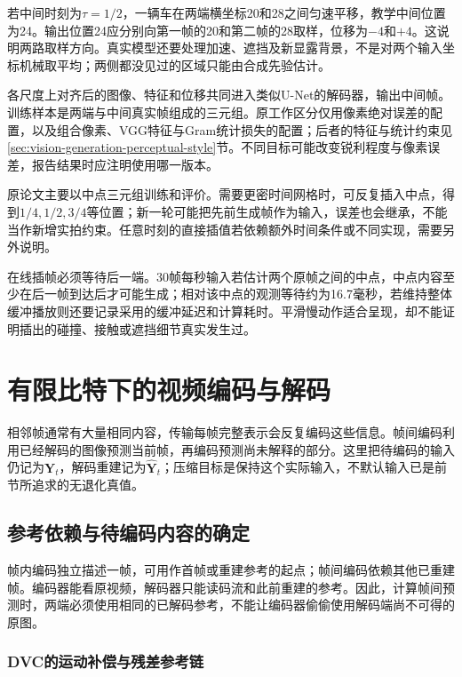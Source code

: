 若中间时刻为$\tau=1/2$，一辆车在两端横坐标20和28之间匀速平移，教学中间位置为24。输出位置24应分别向第一帧的20和第二帧的28取样，位移为$-4$和$+4$。这说明两路取样方向。真实模型还要处理加速、遮挡及新显露背景，不是对两个输入坐标机械取平均；两侧都没见过的区域只能由合成先验估计。

各尺度上对齐后的图像、特征和位移共同进入类似U-Net的解码器，输出中间帧。训练样本是两端与中间真实帧组成的三元组。原工作区分仅用像素绝对误差的配置，以及组合像素、VGG特征与Gram统计损失的配置；后者的特征与统计约束见\ref{sec:vision-generation-perceptual-style}节。不同目标可能改变锐利程度与像素误差，报告结果时应注明使用哪一版本。

原论文主要以中点三元组训练和评价。需要更密时间网格时，可反复插入中点，得到$1/4,1/2,3/4$等位置；新一轮可能把先前生成帧作为输入，误差也会继承，不能当作新增实拍约束。任意时刻的直接插值若依赖额外时间条件或不同实现，需要另外说明。

在线插帧必须等待后一端。30帧每秒输入若估计两个原帧之间的中点，中点内容至少在后一帧到达后才可能生成；相对该中点的观测等待约为16.7毫秒，若维持整体缓冲播放则还要记录采用的缓冲延迟和计算耗时。平滑慢动作适合呈现，却不能证明插出的碰撞、接触或遮挡细节真实发生过。

\section{有限比特下的视频编码与解码}
\label{sec:vision-video-codec}

相邻帧通常有大量相同内容，传输每帧完整表示会反复编码这些信息。帧间编码利用已经解码的图像预测当前帧，再编码预测尚未解释的部分。这里把待编码的输入仍记为$\bm{Y}_t$，解码重建记为$\widehat{\bm{Y}}_t$；压缩目标是保持这个实际输入，不默认输入已是前节所追求的无退化真值。

\subsection{参考依赖与待编码内容的确定}
\label{sec:vision-video-codec-reference}

帧内编码独立描述一帧，可用作首帧或重建参考的起点；帧间编码依赖其他已重建帧。编码器能看原视频，解码器只能读码流和此前重建的参考。因此，计算帧间预测时，两端必须使用相同的已解码参考，不能让编码器偷偷使用解码端尚不可得的原图。

\subsubsection{DVC的运动补偿与残差参考链}
\label{sec:vision-video-dvc}

